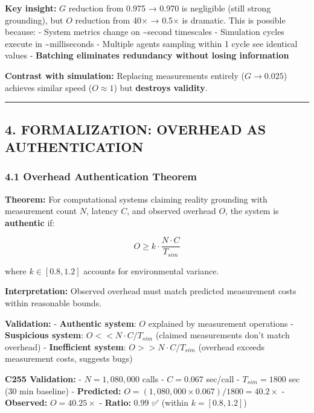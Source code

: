 \documentclass[
]{article}
\begin{document}
\textbf{Key insight:} \(G\) reduction from 0.975 → 0.970 is negligible
(still strong grounding), but \(O\) reduction from 40× → 0.5× is
dramatic. This is possible because: - System metrics change on
\textasciitilde second timescales - Simulation cycles execute in
\textasciitilde milliseconds - Multiple agents sampling within 1 cycle
see identical values - \textbf{Batching eliminates redundancy without
losing information}

\textbf{Contrast with simulation:} Replacing measurements entirely
(\(G → 0.025\)) achieves similar speed (\(O \approx 1\)) but
\textbf{destroys validity}.

\begin{center}\rule{0.5\linewidth}{0.5pt}\end{center}

\subsection{4. FORMALIZATION: OVERHEAD AS
AUTHENTICATION}\label{formalization-overhead-as-authentication}

\subsubsection{4.1 Overhead Authentication
Theorem}\label{overhead-authentication-theorem}

\textbf{Theorem:} For computational systems claiming reality grounding
with measurement count \(N\), latency \(C\), and observed overhead
\(O\), the system is \textbf{authentic} if:

\[O \geq k \cdot \frac{N \cdot C}{T_{sim}}\]

where \(k \in [0.8, 1.2]\) accounts for environmental variance.

\textbf{Interpretation:} Observed overhead must match predicted
measurement costs within reasonable bounds.

\textbf{Validation:} - \textbf{Authentic system}: \(O\) explained by
measurement operations - \textbf{Suspicious system}:
\(O << N \cdot C / T_{sim}\) (claimed measurements don't match overhead)
- \textbf{Inefficient system}: \(O >> N \cdot C / T_{sim}\) (overhead
exceeds measurement costs, suggests bugs)

\textbf{C255 Validation:} - \(N = 1,080,000\) calls - \(C = 0.067\)
sec/call - \(T_{sim} = 1800\) sec (30 min baseline) -
\textbf{Predicted:} \(O = (1,080,000 \times 0.067) / 1800 = 40.2×\) -
\textbf{Observed:} \(O = 40.25×\) - \textbf{Ratio:} \(0.99\) ✅ (within
\(k = [0.8, 1.2]\))
\end{document}
